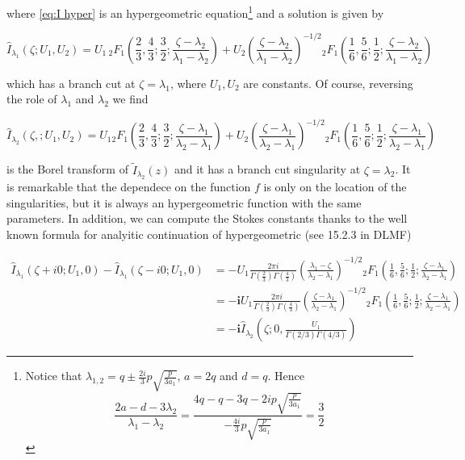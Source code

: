 \documentclass[11pt,a4paper,twoside,leqno,noamsfonts]{amsart}
\numberwithin{equation}{section}
\begin{document}
where \eqref{eq:I hyper} is an hypergeometric equation\footnote{Notice that $\lambda_{1,2}=q\pm \frac{2i}{3}p\sqrt{\frac{p}{3a_1}}$, $a=2q$ and $d=q$. Hence \[\frac{2a-d-3\lambda_2}{\lambda_1-\lambda_2}=\frac{4q-q-3q-2ip\sqrt{\frac{p}{3a_1}}}{-\frac{4i}{3}p\sqrt{\frac{p}{3a_1}}}=\frac{3}{2}\]} and a solution is given by

\begin{equation}
\hat{I}_{\lambda_1}(\zeta;U_1,U_2)=U_1\,{}_2F_1\left(\frac{2}{3},\frac{4}{3};\frac{3}{2};\frac{\zeta-\lambda_2}{\lambda_1-\lambda_2}\right)+U_2\left(\frac{\zeta-\lambda_2}{\lambda_1-\lambda_2}\right)^{-1/2}{}_2F_1\left(\frac{1}{6},\frac{5}{6};\frac{1}{2};\frac{\zeta-\lambda_2}{\lambda_1-\lambda_2}\right)
\end{equation}  

which has a branch cut at $\zeta=\lambda_1$, where $U_1,U_2$ are constants. Of course, reversing the role of $\lambda_1$ and $\lambda_2$ we find  

\begin{equation}
\hat{I}_{\lambda_2}(\zeta,;U_1,U_2)=U_1{}_2F_1\left(\frac{2}{3},\frac{4}{3};\frac{3}{2};\frac{\zeta-\lambda_1}{\lambda_2-\lambda_1}\right)+U_2\left(\frac{\zeta-\lambda_1}{\lambda_2-\lambda_1}\right)^{-1/2}{}_2F_1\left(\frac{1}{6},\frac{5}{6};\frac{1}{2};\frac{\zeta-\lambda_1}{\lambda_2-\lambda_1}\right)
\end{equation} 

is the Borel transform of $\tilde{I}_{\lambda_2}(z)$ and it has a branch cut singularity at $\zeta=\lambda_2$. It is remarkable that  the dependece on the function $f$ is only on the location of the singularities, but it is always an hypergeometric function with the same parameters. In addition, we can compute the Stokes constants thanks to the well known formula for analyitic continuation of hypergeometric (see 15.2.3 in DLMF) 

\begin{align*}
\hat{I}_{\lambda_1}(\zeta+i0;U_1,0)-\hat{I}_{\lambda_1}(\zeta-i0;U_1,0)&=-U_1\frac{2\pi i}{\Gamma\left(\frac{2}{3}\right)\Gamma\left(\frac{4}{3}\right)}\left(\frac{\lambda_1-\zeta}{\lambda_2-\lambda_1}\right)^{-1/2}{}_2F_1\left(\frac{1}{6},\frac{5}{6};\frac{1}{2};\frac{\zeta-\lambda_1}{\lambda_2-\lambda_1}\right)\\
&=\mathbf{-i}U_1\frac{2\pi i}{\Gamma\left(\frac{2}{3}\right)\Gamma\left(\frac{4}{3}\right)}\left(\frac{\zeta-\lambda_1}{\lambda_2-\lambda_1}\right)^{-1/2}{}_2F_1\left(\frac{1}{6},\frac{5}{6};\frac{1}{2};\frac{\zeta-\lambda_1}{\lambda_2-\lambda_1}\right)\\
&=\mathbf{-i} \hat{I}_{\lambda_2}\left(\zeta;0,\frac{U_1}{\Gamma(2/3)\Gamma(4/3)}\right)
\end{align*}
    
\end{document}
